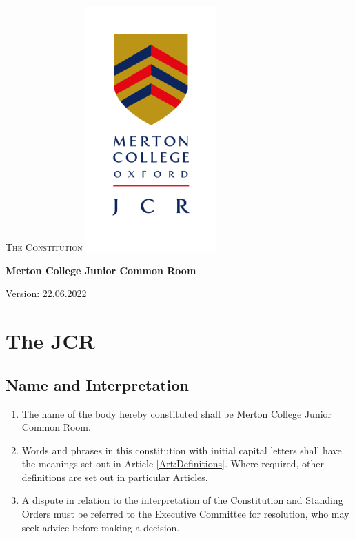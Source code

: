 \documentclass[11pt,a4paper, oneside]{memoir}
\begin{document}
	\pagestyle{plain}
	\thispagestyle{empty}
	\begin{center}
		\null\vfill
		{\Huge 
			\textsc{The Constitution}
			\linebreak
		}
		\vfill
		\includegraphics[width=5cm]{mertoncollegejcr}
		\vfill
		\begin{Spacing}{1.3}
			\huge
			\textbf{Merton College Junior Common Room}
			\linebreak
		\end{Spacing}
		\begin{Spacing}{1.3}
			\Large
			Version: 22.06.2022
		\end{Spacing}
		
		\vfill
	\end{center}
	\cleardoublepage
	\frontmatter
	\tableofcontents*
	\mainmatter
	\pagestyle{plain}
	\chapter{The JCR}
	\section{Name and Interpretation}
	\label{Art:Name}
	\begin{enumerate}
		\item The name of the body hereby constituted shall be Merton College Junior Common Room. 
		\item Words and phrases in this constitution with initial capital letters shall have the meanings set out in Article \ref{Art:Definitions}.
		Where required, other definitions are set out in particular Articles.
		\item A dispute in relation to the interpretation of the Constitution and Standing Orders must be referred to the Executive Committee for resolution, who may seek advice before making a decision.
	\end{enumerate}
\end{document}

